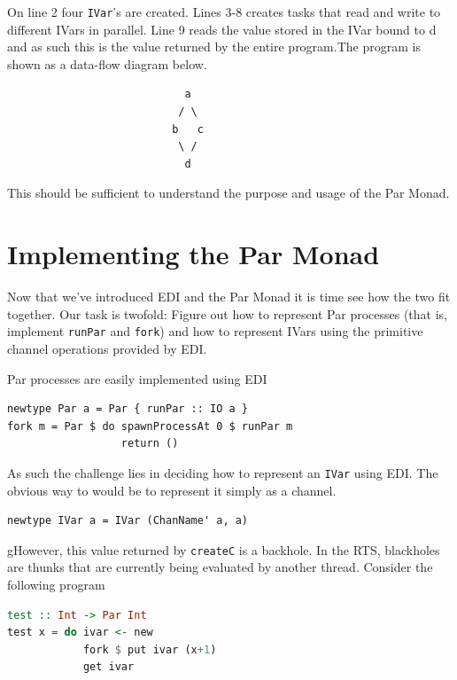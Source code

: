 \documentclass[a4paper, oneside, final]{memoir}
\begin{document}
On line 2 four \texttt{IVar}'s are created. Lines 3-8 creates tasks
that read and write to different IVars in parallel. Line 9 reads the
value stored in the IVar bound to d and as such this is the value
returned by the entire program.The program is shown as a data-flow
diagram below. \newline

\begin{lstlisting}
                            a
                           / \  
                          b   c
                           \ /
                            d
\end{lstlisting}

This should be sufficient to understand the purpose and usage of the
Par Monad.

\newpage

\section{Implementing the Par Monad}

Now that we've introduced EDI and the Par Monad it is time see how 
the two fit together. Our task is twofold: Figure out how to 
represent Par processes (that is, implement \texttt{runPar} and 
\texttt{fork}) and how to represent IVars using the primitive
channel operations provided by EDI.

Par processes are easily implemented using EDI \newline

\begin{lstlisting}
newtype Par a = Par { runPar :: IO a }
fork m = Par $ do spawnProcessAt 0 $ runPar m
                  return ()
\end{lstlisting}

As such the challenge lies in deciding how to represent an \texttt{IVar}
using EDI. The obvious way to would be to represent it simply as a
channel. \newline

\begin{lstlisting}
newtype IVar a = IVar (ChanName' a, a)
\end{lstlisting}

gHowever, this value returned by \texttt{createC} is a backhole. In 
the RTS, blackholes are thunks that are currently being evaluated by
another thread. Consider the following program \newline 

\begin{lstlisting}[language=Haskell]
test :: Int -> Par Int
test x = do ivar <- new
            fork $ put ivar (x+1)
            get ivar
\end{lstlisting}
\end{document}
